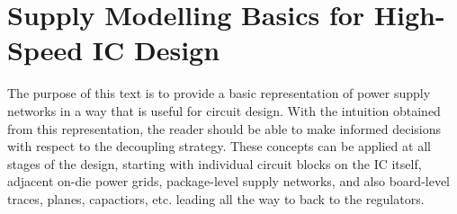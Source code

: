 %
\section{Supply Modelling Basics for High-Speed IC Design}
\par The purpose of this text is to provide a basic representation of power supply
networks in a way that is useful for circuit design.  With the intuition obtained
from this representation, the reader should be able to make informed decisions
with respect to the decoupling strategy. These concepts can be applied at all
stages of the design, starting with individual circuit blocks on the IC itself,
adjacent on-die power grids, package-level supply networks, and also board-level
traces, planes, capactiors, etc. leading all the way to back to the regulators.
%
